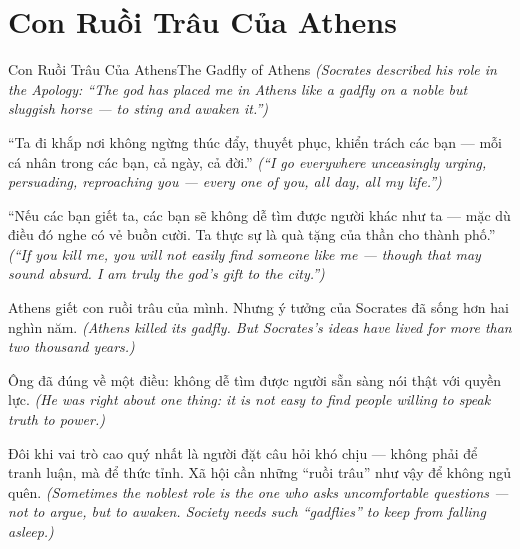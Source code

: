 \section{Con Ruồi Trâu Của Athens}
\begin{truyen}{Con Ruồi Trâu Của Athens}{The Gadfly of Athens}
\textit{(Socrates described his role in the Apology: ``The god has placed me in Athens like a gadfly on a noble but sluggish horse — to sting and awaken it.'')}

``Ta đi khắp nơi không ngừng thúc đẩy, thuyết phục, khiển trách các bạn — mỗi cá nhân trong các bạn, cả ngày, cả đời.''
\textit{(``I go everywhere unceasingly urging, persuading, reproaching you — every one of you, all day, all my life.'')}

``Nếu các bạn giết ta, các bạn sẽ không dễ tìm được người khác như ta — mặc dù điều đó nghe có vẻ buồn cười. Ta thực sự là quà tặng của thần cho thành phố.''
\textit{(``If you kill me, you will not easily find someone like me — though that may sound absurd. I am truly the god's gift to the city.'')}

Athens giết con ruồi trâu của mình. Nhưng ý tưởng của Socrates đã sống hơn hai nghìn năm.
\textit{(Athens killed its gadfly. But Socrates's ideas have lived for more than two thousand years.)}

Ông đã đúng về một điều: không dễ tìm được người sẵn sàng nói thật với quyền lực.
\textit{(He was right about one thing: it is not easy to find people willing to speak truth to power.)}

\end{truyen}

\begin{baihoc}
Đôi khi vai trò cao quý nhất là người đặt câu hỏi khó chịu — không phải để tranh luận, mà để thức tỉnh. Xã hội cần những ``ruồi trâu'' như vậy để không ngủ quên.
\textit{(Sometimes the noblest role is the one who asks uncomfortable questions — not to argue, but to awaken. Society needs such ``gadflies'' to keep from falling asleep.)}
\end{baihoc}
